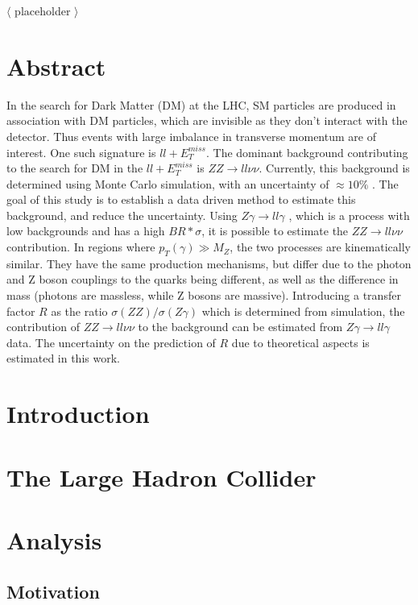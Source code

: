 \documentclass[11pt,a4paper]{report}
\newcommand{\ZZ}{$ZZ\to ll\nu\nu$ }
\newcommand{\Zg}{$Z\gamma\to ll\gamma$ }
\newcommand\blankpage{%
    \null
    \thispagestyle{empty}%
    \addtocounter{page}{-1}%
    \newpage}
\begin{document}
$\langle$ placeholder $\rangle$

\newpage
\blankpage
\newpage

\chapter*{Abstract}
\setcounter{page}{1}
In the search for Dark Matter (DM) at the LHC, SM particles are produced in association with DM particles, which are invisible as they don't interact with the detector. Thus events with large imbalance in transverse momentum are of interest. One such signature is $ll + E_T^{miss}$. The dominant background contributing to the search for DM in the $ll + E_T^{miss}$ is $ZZ \rightarrow ll\nu\nu$.  Currently, this background is determined using Monte Carlo simulation, with an uncertainty of $\approx 10\%$ \cite{ZH_ATLAS}. The goal of this study is to establish a data driven method to estimate this background, and reduce the uncertainty. Using \Zg, which is a process with low backgrounds and has a high $BR*\sigma$, it is possible to estimate the \ZZ contribution. In regions where $p_{T}(\gamma) \gg M_{Z}$, the two processes are kinematically similar. They have the same production mechanisms, but differ due to the photon and Z boson couplings to the quarks being different, as well as the difference in mass (photons are massless, while Z bosons are massive). Introducing a transfer factor $R$ as the ratio $\sigma(ZZ)/\sigma(Z\gamma)$ which is determined from simulation, the contribution of \ZZ to the background can be estimated from \Zg data. The uncertainty on the prediction of $R$ due to theoretical aspects is estimated in this work.

\tableofcontents
\thispagestyle{empty}
\newpage
\cleardoublepage
{}
\chapter{Introduction}
\cleardoublepage
\chapter{The Large Hadron Collider}
\cleardoublepage
\chapter{Analysis}
\section{Motivation}
\cleardoublepage
\end{document}
